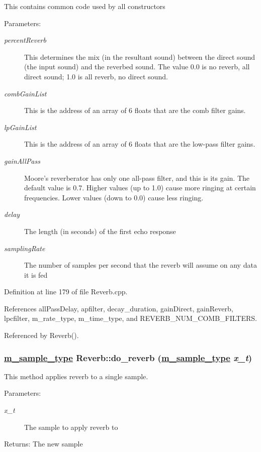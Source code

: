 This contains common code used by all constructors \begin{Desc}
\item[Parameters:]
\begin{description}
\item[{\em percent\-Reverb}]This determines the mix (in the resultant sound) between the direct sound (the input sound) and the reverbed sound. The value 0.0 is no reverb, all direct sound; 1.0 is all reverb, no direct sound. \item[{\em comb\-Gain\-List}]This is the address of an array of 6 floats that are the comb filter gains. \item[{\em lp\-Gain\-List}]This is the address of an array of 6 floats that are the low-pass filter gains. \item[{\em gain\-All\-Pass}]Moore's reverberator has only one all-pass filter, and this is its gain. The default value is 0.7. Higher values (up to 1.0) cause more ringing at certain frequencies. Lower values (down to 0.0) cause less ringing. \item[{\em delay}]The length (in seconds) of the first echo response \item[{\em sampling\-Rate}]The number of samples per second that the reverb will assume on any data it is fed \end{description}
\end{Desc}


Definition at line 179 of file Reverb.cpp.

References all\-Pass\-Delay, apfilter, decay\_\-duration, gain\-Direct, gain\-Reverb, lpcfilter, m\_\-rate\_\-type, m\_\-time\_\-type, and REVERB\_\-NUM\_\-COMB\_\-FILTERS.

Referenced by Reverb().\hypertarget{classReverb_a6}{
\subsubsection[do\_\-reverb]{\setlength{\rightskip}{0pt plus 5cm}\hyperlink{Types_8h_a0}{m\_\-sample\_\-type} Reverb::do\_\-reverb (\hyperlink{Types_8h_a0}{m\_\-sample\_\-type} {\em x\_\-t})}}
\label{classReverb_a6}


This method applies reverb to a single sample. \begin{Desc}
\item[Parameters:]
\begin{description}
\item[{\em x\_\-t}]The sample to apply reverb to \end{description}
\end{Desc}
\begin{Desc}
\item[Returns:]The new sample \end{Desc}


